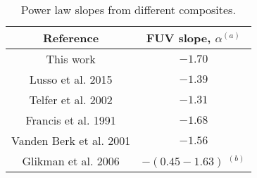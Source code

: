 \begin{table}
\centering
\begin{center}
\caption{Power law slopes from different composites.}
\begin{tabular}{cc}
\hline
\noalign{\smallskip}
Reference &  FUV slope, $\alpha$$^{(a)}$ \\  
\hline


This work  & $-1.70$   \\
Lusso et al. 2015  & $-1.39$   \\
Telfer et al. 2002  & $-1.31$   \\
Francis et al. 1991  & $-1.68 $   \\

Vanden Berk et al. 2001  & $-1.56$   \\
Glikman et al. 2006 & $-(0.45 - 1.63)$ $^{(b)}$  \\

\hline
\hline
\end{tabular}
\end{center}


\end{table}



